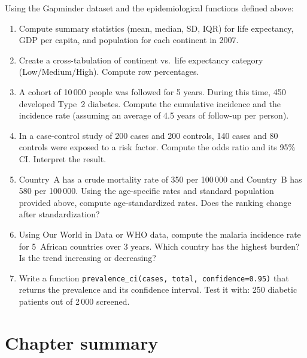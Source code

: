 \begin{exercise}
Using the Gapminder dataset and the epidemiological functions defined above:
\begin{enumerate}
  \item Compute summary statistics (mean, median, SD, IQR) for life expectancy, GDP per capita, and population for each continent in 2007.
  \item Create a cross-tabulation of continent vs.\ life expectancy category (Low/Medium/High). Compute row percentages.
  \item A cohort of 10\,000 people was followed for 5 years. During this time, 450 developed Type~2 diabetes. Compute the cumulative incidence and the incidence rate (assuming an average of 4.5 years of follow-up per person).
  \item In a case-control study of 200 cases and 200 controls, 140 cases and 80 controls were exposed to a risk factor. Compute the odds ratio and its 95\% CI. Interpret the result.
  \item Country~A has a crude mortality rate of 350 per 100\,000 and Country~B has 580 per 100\,000. Using the age-specific rates and standard population provided above, compute age-standardized rates. Does the ranking change after standardization?
  \item Using Our World in Data or WHO data, compute the malaria incidence rate for 5~African countries over 3 years. Which country has the highest burden? Is the trend increasing or decreasing?
  \item Write a function \texttt{prevalence\_ci(cases, total, confidence=0.95)} that returns the prevalence and its confidence interval. Test it with: 250 diabetic patients out of 2\,000 screened.
\end{enumerate}
\end{exercise}

\section{Chapter summary}

